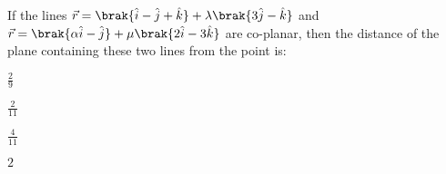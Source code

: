 \item If the lines $\vec{r}=\brak{\hat{i}-\hat{j}+\hat{k}}+\lambda\brak{3\hat{j}-\hat{k}}$ and $\vec{r}=\brak{\alpha\hat{i}-\hat{j}}+\mu\brak{2\hat{i}-3\hat{k}}$ are co-planar, then the distance of the plane containing these two lines from the point  is:

\hfill{}
\begin{enumerate}
\begin{multicols}{4}
\item $\frac{2}{9}$
\item $\frac{2}{11}$
\item $\frac{4}{11}$
\item $2$
\end{multicols}
\end{enumerate}

